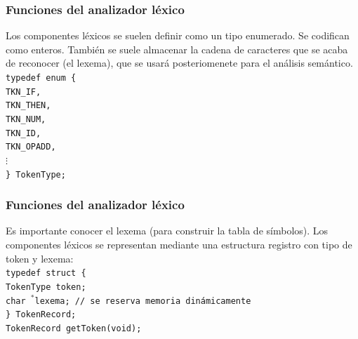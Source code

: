 \documentclass{beamer}
\begin{document}
		\begin{frame}
			\frametitle{Funciones del analizador l\'exico}

			\begin{alertblock}{}
			    Los componentes l\'exicos se suelen definir como un tipo enumerado. Se codifican como enteros. Tambi\'en se suele almacenar la cadena de caracteres que se acaba de reconocer (el lexema), que se usar\'a posteriomenete para el an\'alisis sem\'antico. \\
			    \vspace{.5cm}
			        \hspace{3cm} \texttt{typedef enum \{ \\
			        \hspace{4cm} TKN\_IF, \\
			        \hspace{4cm} TKN\_THEN, \\
			        \hspace{4cm} TKN\_NUM, \\
			        \hspace{4cm} TKN\_ID, \\
			        \hspace{4cm} TKN\_OPADD,\\
			        \hspace{4cm} $\vdots$ \\
			        \hspace{3cm} \} TokenType;}
			\end{alertblock}
		\end{frame}		

		\begin{frame}
			\frametitle{Funciones del analizador l\'exico}

			\begin{alertblock}{}
			    Es importante conocer el lexema (para construir la tabla de s\'imbolos). Los componentes l\'exicos se representan mediante una estructura registro con tipo de token y lexema: \\
			    \vspace{.5cm}
			        \hspace{1cm} \texttt{typedef struct \{ \\
			        \hspace{1.9cm} TokenType token; \\
			        \hspace{1.9cm} char $^*$lexema; // se reserva memoria din\'amicamente \\
			        \hspace{1cm} \} TokenRecord; \\
			        \hspace{1cm} TokenRecord getToken(void);}
			\end{alertblock}
		\end{frame}	
\end{document}
